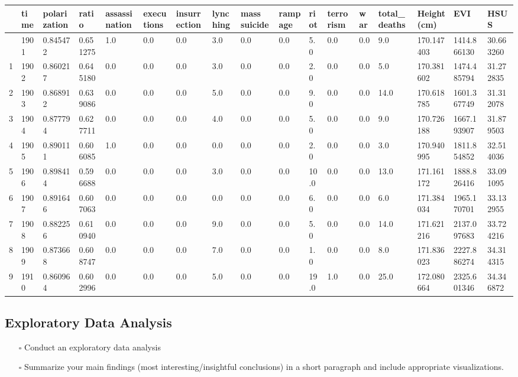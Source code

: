\documentclass[
  letterpaper,
  DIV=11,
  numbers=noendperiod]{scrartcl}
\providecommand{\tightlist}{%
  \setlength{\itemsep}{0pt}\setlength{\parskip}{0pt}}\usepackage{longtable,booktabs,array}
\begin{document}
\begin{longtable}[]{@{}lllllllllllllllll@{}}
\toprule\noalign{}
& time & polarization & ratio & assassination & executions &
insurrection & lynching & mass suicide & rampage & riot & terrorism &
war & total\_deaths & Height(cm) & EVI & HSUS \\
\midrule\noalign{}
\endhead
\bottomrule\noalign{}
\endlastfoot
0 & 1901 & 0.845472 & 0.651275 & 1.0 & 0.0 & 0.0 & 3.0 & 0.0 & 0.0 & 5.0
& 0.0 & 0.0 & 9.0 & 170.147403 & 1414.866130 & 30.663260 \\
1 & 1902 & 0.860217 & 0.645180 & 0.0 & 0.0 & 0.0 & 3.0 & 0.0 & 0.0 & 2.0
& 0.0 & 0.0 & 5.0 & 170.381602 & 1474.485794 & 31.272835 \\
2 & 1903 & 0.868912 & 0.639086 & 0.0 & 0.0 & 0.0 & 5.0 & 0.0 & 0.0 & 9.0
& 0.0 & 0.0 & 14.0 & 170.618785 & 1601.367749 & 31.312078 \\
3 & 1904 & 0.877794 & 0.627711 & 0.0 & 0.0 & 0.0 & 4.0 & 0.0 & 0.0 & 5.0
& 0.0 & 0.0 & 9.0 & 170.726188 & 1667.193907 & 31.879503 \\
4 & 1905 & 0.890111 & 0.606085 & 1.0 & 0.0 & 0.0 & 0.0 & 0.0 & 0.0 & 2.0
& 0.0 & 0.0 & 3.0 & 170.940995 & 1811.854852 & 32.514036 \\
5 & 1906 & 0.898414 & 0.596688 & 0.0 & 0.0 & 0.0 & 3.0 & 0.0 & 0.0 &
10.0 & 0.0 & 0.0 & 13.0 & 171.161172 & 1888.826416 & 33.091095 \\
6 & 1907 & 0.891646 & 0.607063 & 0.0 & 0.0 & 0.0 & 0.0 & 0.0 & 0.0 & 6.0
& 0.0 & 0.0 & 6.0 & 171.384034 & 1965.170701 & 33.132955 \\
7 & 1908 & 0.882256 & 0.610940 & 0.0 & 0.0 & 0.0 & 9.0 & 0.0 & 0.0 & 5.0
& 0.0 & 0.0 & 14.0 & 171.621216 & 2137.097683 & 33.724216 \\
8 & 1909 & 0.873668 & 0.608747 & 0.0 & 0.0 & 0.0 & 7.0 & 0.0 & 0.0 & 1.0
& 0.0 & 0.0 & 8.0 & 171.836023 & 2227.886274 & 34.314315 \\
9 & 1910 & 0.860964 & 0.602996 & 0.0 & 0.0 & 0.0 & 5.0 & 0.0 & 0.0 &
19.0 & 1.0 & 0.0 & 25.0 & 172.080664 & 2325.601346 & 34.346872 \\
\end{longtable}

\subsection{Exploratory Data Analysis}\label{exploratory-data-analysis}

\begin{itemize}
\tightlist
\item[$\square$]
  Conduct an exploratory data analysis
\item[$\square$]
  Summarize your main findings (most interesting/insightful conclusions)
  in a short paragraph and include appropriate visualizations.
\end{itemize}
\end{document}
